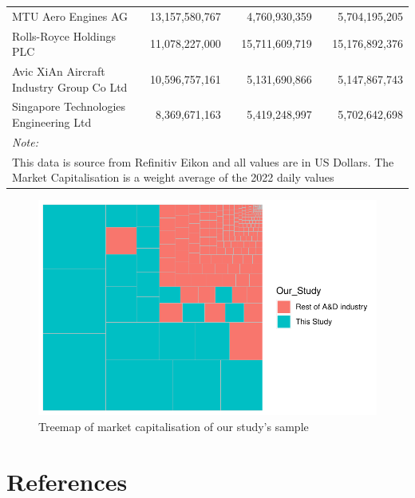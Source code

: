 \documentclass[
  letterpaper,
  DIV=11,
  numbers=noendperiod]{scrartcl}
\begin{document}
\begin{table}[H]
{\begin{tabular}[t]{lrrr}
MTU Aero Engines AG & 13,157,580,767 & 4,760,930,359 & 5,704,195,205\\
Rolls-Royce Holdings PLC & 11,078,227,000 & 15,711,609,719 & 15,176,892,376\\
Avic XiAn Aircraft Industry Group Co Ltd & 10,596,757,161 & 5,131,690,866 & 5,147,867,743\\
\addlinespace
Singapore Technologies Engineering Ltd & 8,369,671,163 & 5,419,248,997 & 5,702,642,698\\
\bottomrule
\multicolumn{4}{l}{\rule{0pt}{1em}\textit{Note: }}\\
\multicolumn{4}{l}{\rule{0pt}{1em}This data is source from Refinitiv Eikon and all values are in US Dollars.  The Market Capitalisation is a weight average of the 2022 daily values}\\
\end{tabular}}
\end{table}

\begin{figure}[H]

{\centering \includegraphics{defence_files/figure-pdf/fig-mktcapshare-1.pdf}

}

\caption{\label{fig-mktcapshare}Treemap of market capitalisation of our
study's sample}

\end{figure}

\hypertarget{references}{%
\section*{References}\label{references}}
\end{document}
